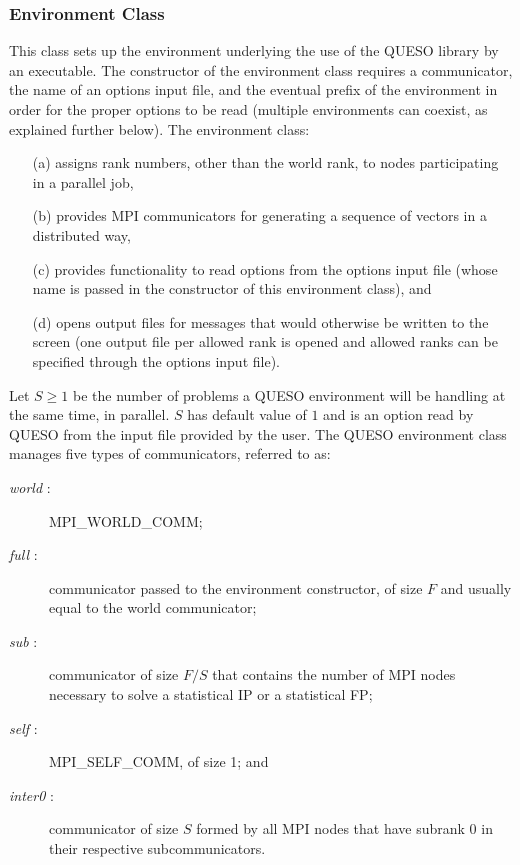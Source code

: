 \subsubsection{Environment Class}
%
This class sets up the environment underlying the use of the QUESO library by an executable.
The constructor of the environment class requires a communicator, the name of an options input file,
and the eventual prefix of the environment in order for the proper options to be read (multiple environments can coexist, as explained further below).
The environment class:
\begin{itemize}
\item[(a)] assigns rank numbers, other than the world rank, to nodes participating in a parallel job,
\item[(b)] provides MPI communicators for generating a sequence of vectors in a distributed way,
\item[(c)] provides functionality to read options from the options input file (whose name is passed in the constructor of this environment class), and
\item[(d)] opens output files for messages that would otherwise be written to the screen (one output file per allowed rank is opened and allowed ranks can be specified through the options input file).
 
\end{itemize}



Let $S \geqslant 1$ be the number of problems a QUESO environment will be handling at the same time, in parallel.
$S$ has default value of $1$ and is an option read by QUESO from the input file provided by the user.
The QUESO environment class manages five types of communicators, referred to as:
\begin{description}
\item[{\it world} :] MPI\_WORLD\_COMM;
\item[{\it full} :] communicator passed to the environment constructor, of size $F$ and usually equal to the world communicator;
\item[{\it sub} :] communicator of size $F/S$ that contains the number of MPI nodes necessary to solve a statistical IP or a statistical FP;
\item[{\it self} :] MPI\_SELF\_COMM, of size 1; and
\item[{\it inter0} :] communicator of size $S$ formed by all MPI nodes that have subrank 0 in their respective subcommunicators.
\end{description}


